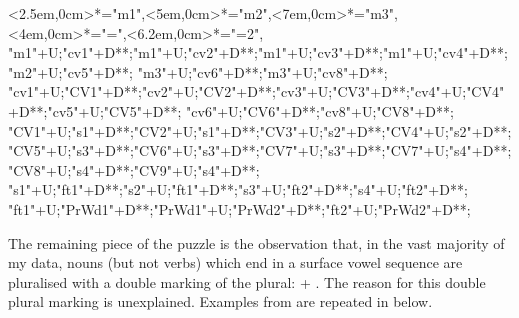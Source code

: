 \begin{multicols}{2}
\begin{exe}
{		<2.5em,0cm>*="m1",<5em,0cm>*="m2",<7em,0cm>*="m3",
		<4em,0cm>*\as{=}="=",<6.2em,0cm>*\as{=}="=2",
		"m1"+U;"cv1"+D**\dir{-};"m1"+U;"cv2"+D**\dir{-};"m1"+U;"cv3"+D**\dir{-};"m1"+U;"cv4"+D**\dir{-};"m2"+U;"cv5"+D**\dir{-};
		"m3"+U;"cv6"+D**\dir{-};"m3"+U;"cv8"+D**\dir{-};
		"cv1"+U;"CV1"+D**\dir{-};"cv2"+U;"CV2"+D**\dir{-};"cv3"+U;"CV3"+D**\dir{-};"cv4"+U;"CV4"+D**\dir{-};"cv5"+U;"CV5"+D**\dir{-};
		"cv6"+U;"CV6"+D**\dir{-};"cv8"+U;"CV8"+D**\dir{-};
		"CV1"+U;"s1"+D**\dir{-};"CV2"+U;"s1"+D**\dir{-};"CV3"+U;"s2"+D**\dir{-};"CV4"+U;"s2"+D**\dir{-};
		"CV5"+U;"s3"+D**\dir{-};"CV6"+U;"s3"+D**\dir{-};"CV7"+U;"s3"+D**\dir{-};"CV7"+U;"s4"+D**\dir{-};"CV8"+U;"s4"+D**\dir{-};"CV9"+U;"s4"+D**\dir{-};
		"s1"+U;"ft1"+D**\dir{-};"s2"+U;"ft1"+D**\dir{-};"s3"+U;"ft2"+D**\dir{-};"s4"+U;"ft2"+D**\dir{-};
		"ft1"+U;"PrWd1"+D**\dir{-};"PrWd1"+U;"PrWd2"+D**\dir{-};"ft2"+U;"PrWd2"+D**\dir{-};
	\endxy}\label{as:kaes=n=ee}
\end{exe}
\end{multicols}

The remaining piece of the puzzle is the observation that,
in the vast majority of my data,
nouns (but not verbs) which end in a surface vowel sequence
are pluralised with a double marking of the plural:
 +  {\ra} .
The reason for this double plural marking is unexplained.
Examples from 
are repeated in  below.

\begin{exe}
	\label{ex:pl->=n/VVnoun-2}
\end{exe}